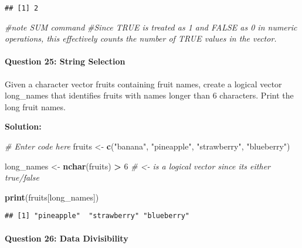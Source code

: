\documentclass[
]{article}
\newenvironment{Shaded}{\begin{snugshade}}{\end{snugshade}}
\newcommand{\CommentTok}[1]{\textcolor[rgb]{0.56,0.35,0.01}{\textit{#1}}}
\newcommand{\DecValTok}[1]{\textcolor[rgb]{0.00,0.00,0.81}{#1}}
\newcommand{\FunctionTok}[1]{\textcolor[rgb]{0.13,0.29,0.53}{\textbf{#1}}}
\newcommand{\NormalTok}[1]{#1}
\newcommand{\OtherTok}[1]{\textcolor[rgb]{0.56,0.35,0.01}{#1}}
\newcommand{\SpecialCharTok}[1]{\textcolor[rgb]{0.81,0.36,0.00}{\textbf{#1}}}
\newcommand{\StringTok}[1]{\textcolor[rgb]{0.31,0.60,0.02}{#1}}
\begin{document}
\begin{verbatim}
## [1] 2
\end{verbatim}

\begin{Shaded}
\begin{Highlighting}[]
\CommentTok{\#note SUM command}
\CommentTok{\#Since TRUE is treated as 1 and FALSE as 0 in numeric operations, this effectively counts the number of TRUE values in the vector.}
\end{Highlighting}
\end{Shaded}

\hypertarget{question-25-string-selection}{%
\paragraph{Question 25: String
Selection}\label{question-25-string-selection}}

Given a character vector fruits containing fruit names, create a logical
vector long\_names that identifies fruits with names longer than 6
characters. Print the long fruit names.

\textbf{Solution:}

\begin{Shaded}
\begin{Highlighting}[]
\CommentTok{\# Enter code here}
\NormalTok{fruits }\OtherTok{\textless{}{-}} \FunctionTok{c}\NormalTok{(}\StringTok{"banana"}\NormalTok{, }\StringTok{"pineapple"}\NormalTok{, }\StringTok{"strawberry"}\NormalTok{, }\StringTok{"blueberry"}\NormalTok{)}

\NormalTok{long\_names }\OtherTok{\textless{}{-}} \FunctionTok{nchar}\NormalTok{(fruits) }\SpecialCharTok{\textgreater{}} \DecValTok{6} \CommentTok{\# \textless{}{-} is a logical vector since it\textquotesingle{}s either true/false}

\FunctionTok{print}\NormalTok{(fruits[long\_names])}
\end{Highlighting}
\end{Shaded}

\begin{verbatim}
## [1] "pineapple"  "strawberry" "blueberry"
\end{verbatim}

\hypertarget{question-26-data-divisibility}{%
\paragraph{Question 26: Data
Divisibility}\label{question-26-data-divisibility}}
\end{document}

